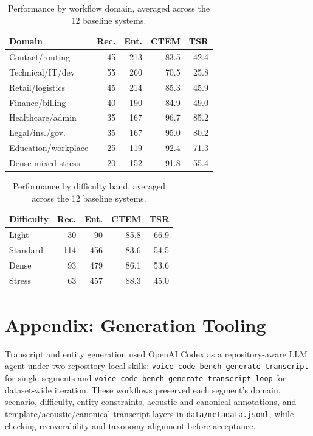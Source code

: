 \documentclass[10pt,twocolumn]{article}
\begin{document}
\begin{table}[!htbp]\centering\scriptsize
	\caption{Performance by workflow domain, averaged across the 12 baseline systems.}\label{tab:appendix-domain-performance}
	\begin{tabular}{lrrrr}
		\toprule
		Domain & Rec. & Ent. & CTEM & TSR
		\\
		\midrule
		Contact/routing & 45 & 213 & 83.5 & 42.4
		\\
		Technical/IT/dev & 55 & 260 & 70.5 & 25.8
		\\
		Retail/logistics & 45 & 214 & 85.3 & 45.9
		\\
		Finance/billing & 40 & 190 & 84.9 & 49.0
		\\
		Healthcare/admin & 35 & 167 & 96.7 & 85.2
		\\
		Legal/ins./gov. & 35 & 167 & 95.0 & 80.2
		\\
		Education/workplace & 25 & 119 & 92.4 & 71.3
		\\
		Dense mixed stress & 20 & 152 & 91.8 & 55.4
		\\
		\bottomrule
	\end{tabular}
\end{table}

\begin{table}[!htbp]\centering\scriptsize
	\caption{Performance by difficulty band, averaged across the 12 baseline systems.}\label{tab:appendix-difficulty-performance}
	\begin{tabular}{lrrrr}
		\toprule
		Difficulty & Rec. & Ent. & CTEM & TSR
		\\
		\midrule
		Light & 30 & 90 & 85.8 & 66.9
		\\
		Standard & 114 & 456 & 83.6 & 54.5
		\\
		Dense & 93 & 479 & 86.1 & 53.6
		\\
		Stress & 63 & 457 & 88.3 & 45.0
		\\
		\bottomrule
	\end{tabular}
\end{table}

\section{Appendix: Generation Tooling}\label{appendix-generation-tooling}
\begingroup\raggedright
Transcript and entity generation used OpenAI Codex as a repository-aware
LLM agent under two repository-local skills:
\texttt{voice-code-bench-}\allowbreak\texttt{generate-transcript} for
single segments and
\texttt{voice-code-bench-}\allowbreak\texttt{generate-transcript-loop}
for dataset-wide iteration. These workflows preserved each segment's
domain, scenario, difficulty, entity constraints, acoustic and canonical
annotations, and template/acoustic/canonical transcript layers in
\texttt{data/metadata.jsonl}, while checking recoverability and taxonomy
alignment before acceptance.
\par\endgroup
\end{document}
